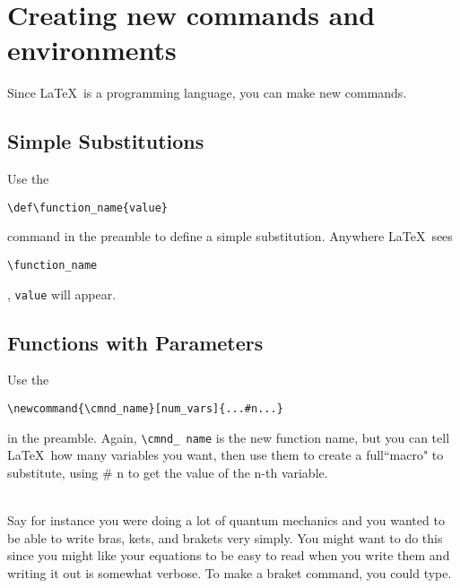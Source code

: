 \section{Creating new commands and environments}
Since \LaTeX\ is a programming language, you can make new commands.

\subsection{Simple Substitutions}
Use the
\begin{verbatim}
\def\function_name{value}
\end{verbatim} command in the preamble to define a simple substitution. Anywhere \LaTeX\ sees 
\begin{verbatim}
\function_name
\end{verbatim}, \texttt{value} will appear.

\subsection{Functions with Parameters} Use the 
\begin{verbatim}
\newcommand{\cmnd_name}[num_vars]{...#n...}
\end{verbatim}  in the preamble. Again, \texttt{\textbackslash cmnd\_ name} is the new function name, but you can tell \LaTeX\ how many variables  you want, then use them to create 
a full``macro" to substitute, using \# n to get the value of the n-th variable.

\begin{example} \hfill \\ Say for instance you were doing a lot of quantum mechanics and you wanted to be able to write bras, kets, and brakets very simply. You might want to do this since you might like your equations to be easy to read when you write them and writing it out is somewhat verbose. To make a braket command, you could type.
\end{example}




